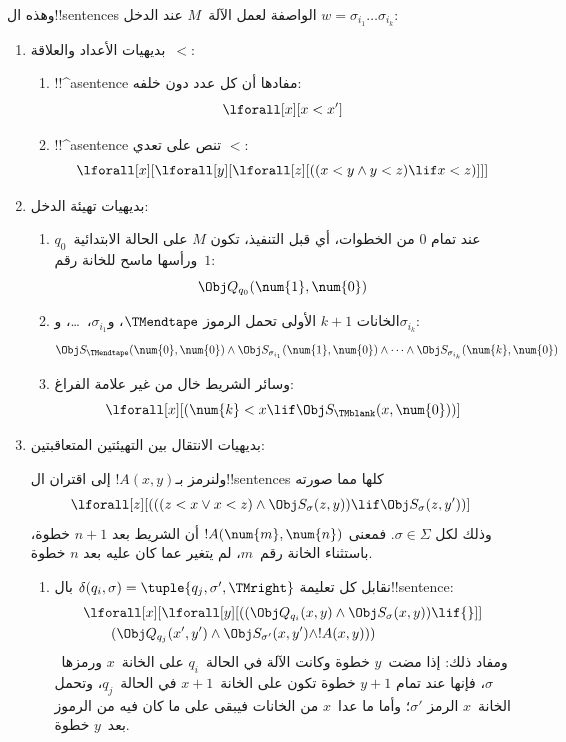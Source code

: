 \documentclass[../../../include/open-logic-section]{subfiles}
\begin{document}
وهذه ال!!{sentence}s الواصفة لعمل الآلة~$M$ عند الدخل
$w=\sigma_{i_1}\dots\sigma_{i_k}$:
\begin{enumerate}
\item بديهيات الأعداد والعلاقة~$<$:
\begin{enumerate}
\item !!^a{sentence} مفادها أن كل عدد دون خلفه:
\[
\lforall[x][x < x']
\]
\item !!^a{sentence} تنص على تعدي $<$:
\[
\lforall[x][\lforall[y][\lforall[z][
      ((x < y \land y < z) \lif x < z)]]]
\]
\end{enumerate}
\item بديهيات تهيئة الدخل:
\begin{enumerate}
\item عند تمام $0$ من الخطوات، أي قبل التنفيذ، تكون $M$ على الحالة
  الابتدائية~$q_0$ ورأسها ماسح للخانة رقم~$1$:
\[
\Obj Q_{q_0}(\num{1},\num{0})
\]
\item الخانات $k+1$ الأولى تحمل الرموز $\TMendtape$،
  و$\sigma_{i_1}$،~\dots، و$\sigma_{i_k}$:
\[
\Obj S_\TMendtape(\num{0}, \num{0}) \land
\Obj S_{\sigma_{i_1}}(\num{1}, \num{0}) \land
\dots \land
\Obj S_{\sigma_{i_k}}(\num{k}, \num{0})
\]
\item وسائر الشريط خال من غير علامة الفراغ:
\[
\lforall[x][(\num{k} < x \lif \Obj S_\TMblank(x, \num{0}))]
\]
\end{enumerate}
\item بديهيات الانتقال بين التهيئتين المتعاقبتين:

ولنرمز بـ$!A(x,y)$ إلى اقتران ال!!{sentence}s كلها مما صورته
\[
\lforall[z][
  (((z < x \lor x < z) \land \Obj S_\sigma(z, y))
  \lif \Obj S_\sigma(z, y'))]
\]
وذلك لكل $\sigma\in\Sigma$. فمعنى $!A(\num{m},\num{n})$ أن
الشريط بعد $n+1$ خطوة، باستثناء الخانة رقم~$m$، لم يتغير عما
كان عليه بعد $n$ خطوة.
\begin{enumerate}
\item {} نقابل كل تعليمة
$\delta(q_i,\sigma)=\tuple{q_j,\sigma',\TMright}$ بال!!{sentence}:
\begin{align*}
& \lforall[x][\lforall[y][(
   (\Obj Q_{q_i}(x, y) \land \Obj S_{\sigma}(x, y)) \lif {}]] \\
&\qquad   (\Obj Q_{q_j}(x', y') \land \Obj S_{\sigma'}(x, y') \land
!A(x, y)))
\end{align*}
ومفاد ذلك: إذا مضت~$y$ خطوة وكانت الآلة في الحالة~$q_i$ على
الخانة~$x$ ورمزها~$\sigma$، فإنها عند تمام $y+1$ خطوة تكون على
الخانة~$x+1$ في الحالة~$q_j$، وتحمل الخانة~$x$ الرمز
$\sigma'$؛ وأما ما عدا~$x$ من الخانات فيبقى على ما كان فيه
من الرموز بعد~$y$ خطوة.


\end{enumerate}
\end{enumerate}
\end{document}
